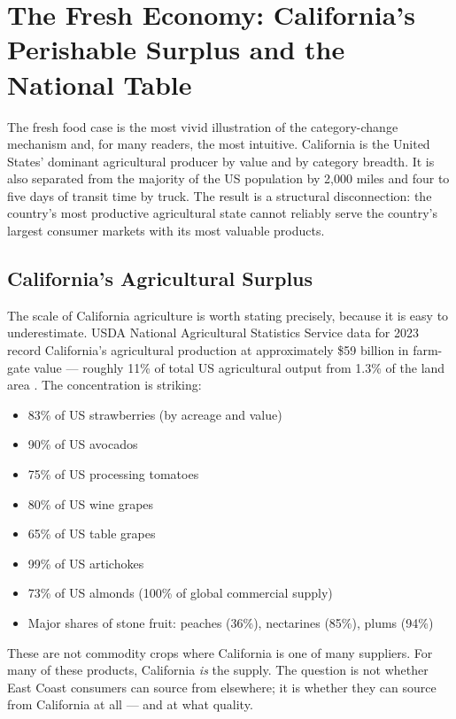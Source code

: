 \section{The Fresh Economy: California's Perishable Surplus and the National Table}
\label{sec:fresh}

The fresh food case is the most vivid illustration of the category-change mechanism and,
for many readers, the most intuitive. California is the United States' dominant
agricultural producer by value and by category breadth. It is also separated from the
majority of the US population by 2,000 miles and four to five days of transit time
by truck. The result is a structural disconnection: the country's most productive
agricultural state cannot reliably serve the country's largest consumer markets with
its most valuable products.

\subsection{California's Agricultural Surplus}

The scale of California agriculture is worth stating precisely, because it is easy to
underestimate. USDA National Agricultural Statistics Service data for 2023 record
California's agricultural production at approximately \$59 billion in farm-gate value ---
roughly 11\% of total US agricultural output from 1.3\% of the land area \citep{USDA_NASS2023}.
The concentration is striking:

\begin{itemize}
\item 83\% of US strawberries (by acreage and value)
\item 90\% of US avocados
\item 75\% of US processing tomatoes
\item 80\% of US wine grapes
\item 65\% of US table grapes
\item 99\% of US artichokes
\item 73\% of US almonds (100\% of global commercial supply)
\item Major shares of stone fruit: peaches (36\%), nectarines (85\%), plums (94\%)
\end{itemize}

\noindent
These are not commodity crops where California is one of many suppliers. For many of these
products, California \textit{is} the supply. The question is not whether East Coast consumers
can source from elsewhere; it is whether they can source from California at all --- and at
what quality.

